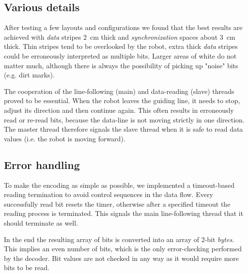 \subsection{Various details}
After testing a few layouts and configurations we found that the best
results are achieved with \textit{data} stripes 2~cm thick and
\textit{synchronization} spaces about 3~cm thick. Thin stripes
tend to be overlooked by the robot, extra thick \textit{data} stripes
could be erroneously interpreted as multiple bits. Larger areas of white
do not matter much, although there is always the possibility of picking
up "noise" bits (e.g. dirt marks).

The cooperation of the line-following (main) and data-reading (slave) threads
proved to be essential. When the robot leaves the guiding line, it needs
to stop, adjust its direction and then continue again.
This often results in erroneously read or re-read bits, because the
data-line is not moving strictly in one direction. The master thread
therefore signals the slave thread when it is safe to read data values
(i.e. the robot is moving forward).

\subsection{Error handling}
To make the encoding as simple as possible, we implemented a
timeout-based reading termination to avoid control sequences in the data
flow. Every successfully read bit resets the timer, otherwise after
a specified timeout the reading process is terminated. This signals
the main line-following thread that it should terminate as well.

In the end the resulting array of bits is converted into an array of
2-bit \textit{bytes}. This implies an even number of bits, which is the
only error-checking performed by the decoder. Bit values are not checked
in any way as it would require more bits to be read.

